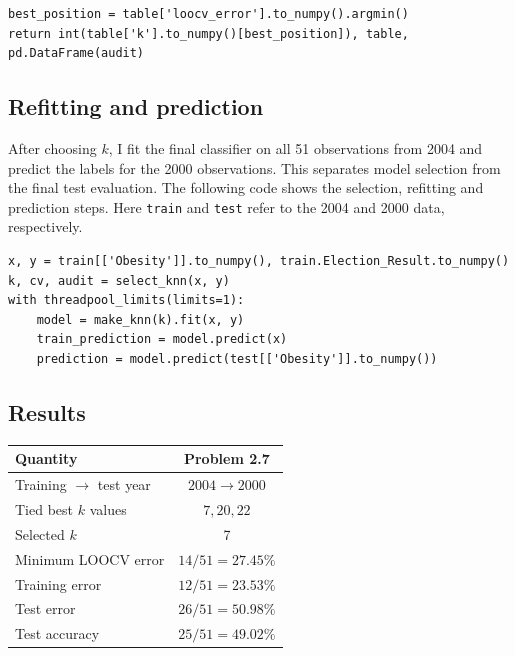 \documentclass[11pt,a4paper]{article}
\begin{document}
\begin{enumerate}
\end{enumerate}

\par\addvspace{4pt}
\noindent\begin{minipage}{\linewidth}
\begin{lstlisting}[style=pythoncode,caption={Excerpt implementing the tie rule for selecting k.}]
best_position = table['loocv_error'].to_numpy().argmin()
return int(table['k'].to_numpy()[best_position]), table, pd.DataFrame(audit)
\end{lstlisting}
\end{minipage}\par\addvspace{4pt}


\subsection*{Refitting and prediction}
After choosing $k$, I fit the final classifier on all 51 observations from 2004 and predict the labels for the 2000 observations. This separates model selection from the final test evaluation. The following code shows the selection, refitting and prediction steps. Here \texttt{train} and \texttt{test} refer to the 2004 and 2000 data, respectively.

\par\addvspace{4pt}
\noindent\begin{minipage}{\linewidth}
\begin{lstlisting}[style=pythoncode,caption={Select k on the training data, refit, and predict the test year.}]
x, y = train[['Obesity']].to_numpy(), train.Election_Result.to_numpy()
k, cv, audit = select_knn(x, y)
with threadpool_limits(limits=1):
    model = make_knn(k).fit(x, y)
    train_prediction = model.predict(x)
    prediction = model.predict(test[['Obesity']].to_numpy())
\end{lstlisting}
\end{minipage}\par\addvspace{4pt}

\subsection*{Results}
\begin{center}\small\begin{tabular}{lc}
\toprule
Quantity & Problem 2.7\\\midrule
Training $\rightarrow$ test year & $2004\rightarrow2000$\\
Tied best $k$ values & $7,20,22$\\
Selected $k$ & 7\\
Minimum LOOCV error & $14/51=27.45\%$\\
Training error & $12/51=23.53\%$\\
Test error & $26/51=50.98\%$\\
Test accuracy & $25/51=49.02\%$\\\bottomrule
\end{tabular}\end{center}
\end{document}
